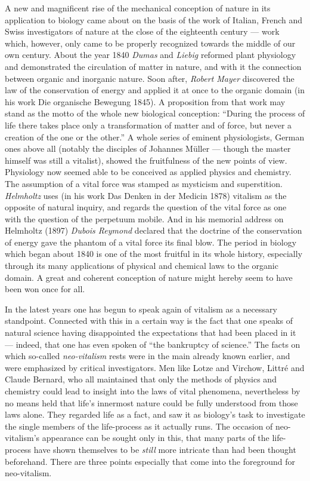 \documentclass[12pt,a4paper,openany]{book}
\newcommand{\opage}[1]{\marginnote{\footnotesize\textit{[#1]}}}
\begin{document}
A new and magnificent rise of the mechanical conception of nature in its application
to biology came about on the basis of the work of Italian, French and Swiss
investigators of nature at the close of the eighteenth century --- work which,
however, only came to be properly recognized towards the middle of our own
century. About the year 1840 \emph{Dumas} and \emph{Liebig} reformed plant
physiology and demonstrated the circulation of matter in nature, and with it the
connection between organic and inorganic nature. Soon after, \emph{Robert Mayer}
discovered the law of the conservation of energy and applied it at once to the
organic domain (in his work Die organische Bewegung 1845). A
proposition from that work may stand as the motto of the whole new biological
conception: ``During the process of life there takes place only a transformation of
matter and of force, but never a creation of the one or the other.'' A whole
series of eminent physiologists, German ones above all (notably the disciples of
Johannes Müller --- though the master himself was still a vitalist), showed the
fruitfulness of the new points of view. Physiology now seemed able to be
conceived as applied physics and chemistry. The assumption of a vital force was
stamped as mysticism and superstition. \emph{Helmholtz} uses (in his work
Das Denken in der Medicin 1878) vitalism as the opposite of natural
inquiry, and regards the question of the vital force as one with the question of
the perpetuum mobile. And in his memorial address on Helmholtz (1897)
\emph{Dubois Reymond} declared that the doctrine of the conservation of energy
gave the phantom of a vital force its final blow. The period in biology which
began about 1840 is one of the most fruitful in its whole history, especially
through its many applications of physical and chemical laws to the organic
domain. A great and coherent conception of nature might hereby seem to have been won
once for all.

In the latest years one has begun to speak again of vitalism as a necessary
standpoint. Connected with this in a certain way is the fact that one speaks of
natural science
\opage{45}having disappointed the expectations that had been placed in it --- indeed, that one
has even spoken of ``the bankruptcy of science.'' The facts on which so-called
\emph{neo-vitalism} rests were in the main already known earlier, and were
emphasized by critical investigators. Men like Lotze and Virchow, Littré and
Claude Bernard, who all maintained that only the methods of physics and
chemistry could lead to insight into the laws of vital phenomena, nevertheless
by no means held that life's innermost nature could be fully understood from
those laws alone. They regarded life as a fact, and saw it as biology's task to
investigate the single members of the life-process as it actually runs. The
occasion of neo-vitalism's appearance can be sought only in this, that many
parts of the life-process have shown themselves to be \emph{still} more
intricate than had been thought beforehand. There are three points especially
that come into the foreground for neo-vitalism.
\end{document}
